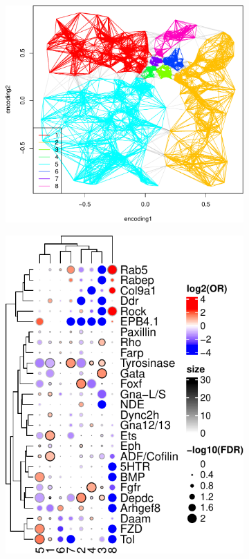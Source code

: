 \documentclass{article}
\begin{document}
\begin{figure}
\begin{subfigure}[b]{0.5\textwidth}
	\end{subfigure} 
	\vspace{1cm}
	\begin{subfigure}[b]{0.37\textwidth}
		\includegraphics[width=\textwidth]{knn.clust.pdf}
		\caption{}
		\label{}
	\end{subfigure}
	\hfill
	\begin{subfigure}[b]{0.25\textwidth}
		\includegraphics[width=\textwidth]{condition.pdf}

\end{subfigure}
\end{figure}
\end{document}
